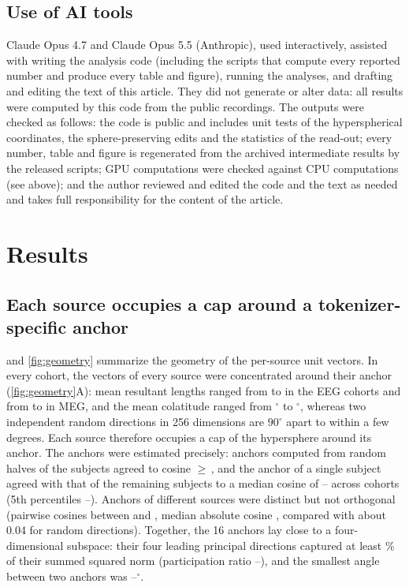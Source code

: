 \documentclass[10pt,letterpaper]{article}
\begin{document}
\subsection*{Use of AI tools}\label{sec:methods-ai}

Claude Opus 4.7 and Claude Opus 5.5 (Anthropic), used interactively, assisted with writing the
analysis code (including the scripts that compute every reported number and produce every table and
figure), running the analyses, and drafting and editing the text of this article. They did not
generate or alter data: all results were computed by this code from the public recordings. The
outputs were checked as follows: the code is public and includes unit tests of the hyperspherical
coordinates, the sphere-preserving edits and the statistics of the read-out; every number, table and
figure is regenerated from the archived intermediate results by the released scripts; GPU computations
were checked against CPU computations (see above); and the author reviewed and edited the code and the
text as needed and takes full responsibility for the content of the article.

\section*{Results}\label{sec:results}

\subsection*{Each source occupies a cap around a tokenizer-specific anchor}\label{sec:res-geometry}

 and \cref{fig:geometry} summarize the geometry of the per-source unit
vectors. In every cohort, the vectors of every source were concentrated around their
anchor (\cref{fig:geometry}A): mean resultant lengths ranged from \RbarMinEEG{} to \RbarMaxEEG{} in the EEG
cohorts and from \RbarMinMEG{} to \RbarMaxMEG{} in MEG, and the mean colatitude ranged from
\AngleMin$^\circ$ to \AngleMax$^\circ$, whereas two independent random directions in 256
dimensions are $90^\circ$ apart to within a few degrees. Each source therefore occupies a
cap of the hypersphere around its anchor. The anchors were estimated precisely: anchors
computed from random halves of the subjects agreed to cosine $\geq$\,\SplitHalfMin{}, and
the anchor of a single subject agreed with that of the remaining subjects to a median cosine
of \LosoMedianMin--\LosoMedianMax{} across cohorts (5th percentiles
\LosoPfiveMin--\LosoPfiveMax). Anchors of different sources were
distinct but not orthogonal (pairwise cosines between \OffdiagMin{} and \OffdiagMax{},
median absolute cosine \OffdiagAbsMedian{}, compared with about 0.04 for random directions).
Together, the 16 anchors lay close to a four-dimensional subspace: their four leading principal
directions captured at least \AnchorFourShareMin\% of their summed squared norm (participation
ratio \AnchorDimMin--\AnchorDimMax), and the smallest angle between two anchors was
\AnchorMinAngleMin--\AnchorMinAngleMax$^\circ$.
\end{document}
